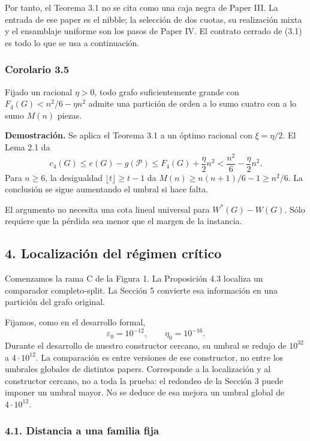 \documentclass[spanish,11pt,a4paper]{article}
\begin{document}
Por tanto, el Teorema 3.1 no se cita como una caja negra de Paper III. La entrada de ese paper es el nibble; la selección de dos cuotas, su realización mixta y el ensamblaje uniforme son los pasos de Paper IV. El contrato cerrado de (3.1) es todo lo que se usa a continuación.

\subsubsection{Corolario 3.5}\label{corolario-3.5}

Fijado un racional \(\eta>0\), todo grafo suficientemente grande con \(F_4(G)<n^2/6-\eta n^2\) admite una partición de orden a lo sumo cuatro con a lo sumo \(M(n)\) piezas.

\textbf{Demostración.} Se aplica el Teorema 3.1 a un óptimo racional con \(\xi=\eta/2\). El Lema 2.1 da \[
c_4(G)\le e(G)-g(\mathcal P)
\le F_4(G)+\frac\eta2n^2
<\frac{n^2}{6}-\frac\eta2n^2.
\] Para \(n\ge6\), la desigualdad \(\lfloor t\rfloor\ge t-1\) da \(M(n)\ge n(n+1)/6-1\ge n^2/6\). La conclusión se sigue aumentando el umbral si hace falta.

El argumento no necesita una cota lineal universal para \(W^*(G)-W(G)\). Sólo requiere que la pérdida sea menor que el margen de la instancia.

\subsection{4. Localización del régimen crítico}\label{localizacion-del-regimen-critico}

Comenzamos la rama C de la Figura 1. La Proposición 4.3 localiza un comparador completo-split. La Sección 5 convierte esa información en una partición del grafo original.

Fijamos, como en el desarrollo formal, \[
\varepsilon_0=10^{-12},\qquad \eta_0=10^{-16}.
\tag{4.1}
\] Durante el desarrollo de nuestro constructor cercano, su umbral se redujo de \(10^{32}\) a \(4\cdot10^{12}\). La comparación es entre versiones de ese constructor, no entre los umbrales globales de distintos papers. Corresponde a la localización y al constructor cercano, no a toda la prueba: el redondeo de la Sección 3 puede imponer un umbral mayor. No se deduce de esa mejora un umbral global de \(4\cdot10^{12}\).

\subsubsection{4.1. Distancia a una familia fija}\label{distancia-a-una-familia-fija}
\end{document}
